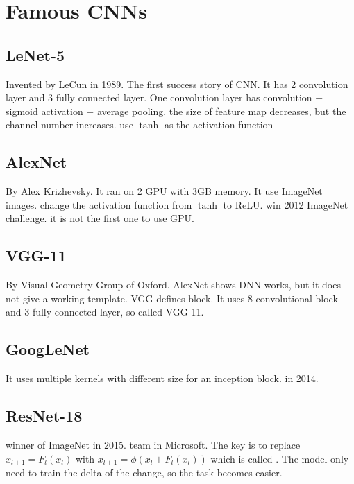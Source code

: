 \section{Famous CNNs}

\subsection{LeNet-5}

Invented by LeCun in 1989. The first success story of CNN. It has 2 convolution layer and 3 fully connected layer. One convolution layer has convolution + sigmoid activation + average pooling. the size of feature map decreases, but the channel number increases. use $\tanh$ as the activation function






\subsection{AlexNet}

By Alex Krizhevsky. It ran on 2 GPU with 3GB memory. It use ImageNet images. change the activation function from $\tanh$ to ReLU. win 2012 ImageNet challenge. it is not the first one to use GPU.

\subsection{VGG-11}

By Visual Geometry Group of Oxford. AlexNet shows DNN works, but it does not give a working template. VGG defines block. It uses 8 convolutional block and 3 fully connected layer, so called VGG-11.


\subsection{GoogLeNet}

It uses multiple kernels with different size for an inception block. in 2014.

\subsection{ResNet-18}

winner of ImageNet in 2015. team in Microsoft. The key is to replace $x_{l+1} = F_l (x_l)$ with $x_{l+1} = \phi(x_l + F_l(x_l))$ which is called . The model only need to train the delta of the change, so the task becomes easier. 

